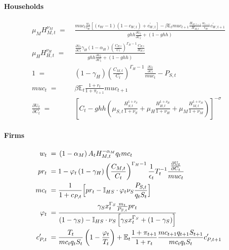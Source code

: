 \documentclass[12pt,3p,authoryear,review]{elsarticle}
\begin{document}
\paragraph{Households}%
\begin{small}%
    \begin{align*}%
        \mu_M H_{M,t}^{\nu_M} \; = & \; \frac{muc_t \frac{w_t}{\epsilon_W} \left[ \left(\epsilon_W-1\right)\left(1-c_{W,t}\right)+c^{\prime}_{W,t} \right] - \beta \mathbb{E}_t muc_{t+1} \frac{H_{M,t+1}}{H_{M,t}} \frac{w_{t+1}}{\epsilon_W} c^{\prime}_{W,t+1}}{ghh \frac{\partial \mathbb{U}_t}{\partial C_t}+\left(1-ghh\right)}\\%
        \mu_H H_{H,t}^{\nu_H} \; = & \; \frac{\frac{\partial \mathbb{U}_t}{\partial C_t}\gamma_H \left(1-\alpha_H\right) \left(\frac{C_{H,t}}{C_t}\right)^{\Gamma_H-1}\frac{C_{H,t}}{H_{H,t}}}{ghh \frac{\partial\mathbb{U}_t}{\partial C_t}+\left(1-ghh\right)}\\%
        1 \; = & \; \left(1-\gamma_H\right) \left(\frac{C_{M,t}}{C_t}\right)^{\Gamma_H-1} \frac{\frac{\partial \mathbb{U}_t}{\partial C_t}}{muc_t} - P_{S,t}\\%
        muc_t \; = & \; \beta \mathbb{E}_t \frac{1+r_t}{1+\pi_{t+1}} muc_{t+1}\\%
        \frac{\partial \mathbb{U}_t}{\partial C_t} \; = & \; \left[ C_t - ghh \left( \mu_{S,t} \frac{H_{S,t}^{1+\nu_S}}{1+\nu_S} + \mu_H \frac{H_{H,t}^{1+\nu_H}}{1+\nu_H} + \mu_M \frac{H_{M,t}^{1+\nu_M}}{1+\nu_M} \right) \right]^{-\sigma}%
    \end{align*}%
\end{small}%
\paragraph{Firms}%
\begin{small}%
    \begin{align*}%
        w_t \; = & \; \left(1-\alpha_M\right) A_t H_{M,t}^{-\alpha_M} q_t mc_{t}\\%
        pr_t \; = & \; 1 - \varphi_t \left(1-\gamma_H\right) \left(\frac{C_{M,t}}{C_t}\right)^{\Gamma_H-1} \frac{1}{\epsilon_t} T_t^{-1} \frac{\frac{\partial \mathbb{U}_t}{\partial C_t}}{muc_t}\\%
        mc_{t} \; = & \; \frac{1}{1+c_{P,t}} \Bigl[ pr_t- \mathbb{I}_{HS} \cdot \varphi_t \nu_S \frac{P_{S,t}}{q_t S_t} \Bigr]\\%
        \varphi_t \; = & \; \frac{\gamma_S x_t^{\Gamma_S} \frac{m_t}{P_{S,t}} pr_t}{(1-\gamma_S)-\mathbb{I}_{HS}\cdot\nu_S \left[ \gamma_S x_t^{\Gamma_S}+\left(1-\gamma_S\right) \right]}\\%
        c^{\prime}_{P,t} \; = & \; \frac{T_t}{mc_{t} q_t S_t} \left(1-\frac{\varphi_t}{T_t}\right) + \mathbb{E}_t \frac{1+\pi_{t+1}}{1+r_t} \frac{mc_{t+1}q_{t+1}S_{t+1}}{mc_{t}q_tS_t} c^{\prime}_{P,t+1}%
    \end{align*}%
\end{small}%
\end{document}
